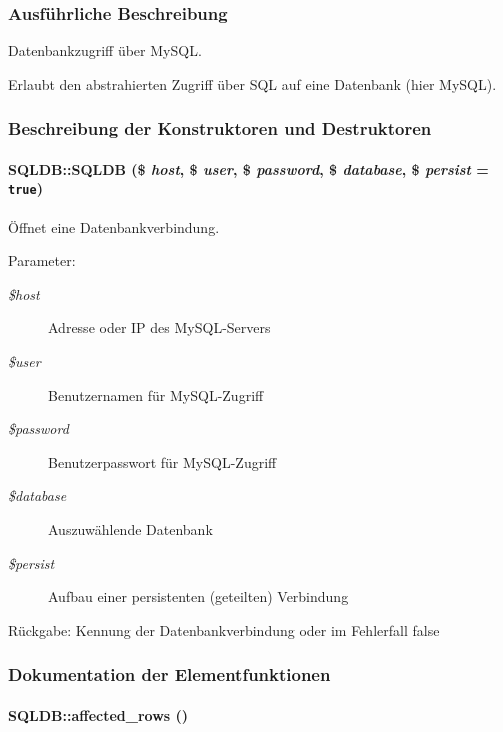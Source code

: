 \subsubsection{Ausf\"{u}hrliche Beschreibung}
Datenbankzugriff über My\-SQL. 

Erlaubt den abstrahierten Zugriff über SQL auf eine Datenbank (hier My\-SQL). 



\subsubsection{Beschreibung der Konstruktoren und Destruktoren}
\hypertarget{classSQLDB_069ba0502ed4bfedb72768a03ff6854d}{
\paragraph[SQLDB]{\setlength{\rightskip}{0pt plus 5cm}SQLDB::SQLDB (\$ {\em host}, \$ {\em user}, \$ {\em password}, \$ {\em database}, \$ {\em persist} = {\tt true})}\hfill}
\label{classSQLDB_069ba0502ed4bfedb72768a03ff6854d}


Öffnet eine Datenbankverbindung. 

\begin{Desc}
\item[Parameter:]
\begin{description}
\item[{\em \$host}]Adresse oder IP des My\-SQL-Servers \item[{\em \$user}]Benutzernamen für My\-SQL-Zugriff \item[{\em \$password}]Benutzerpasswort für My\-SQL-Zugriff \item[{\em \$database}]Auszuwählende Datenbank \item[{\em \$persist}]Aufbau einer persistenten (geteilten) Verbindung \end{description}
\end{Desc}
\begin{Desc}
\item[R\"{u}ckgabe:]Kennung der Datenbankverbindung oder im Fehlerfall false \end{Desc}


\subsubsection{Dokumentation der Elementfunktionen}
\hypertarget{classSQLDB_2d1ec94a4c94e4a505ec37f944363954}{
\paragraph[affected\_\-rows]{\setlength{\rightskip}{0pt plus 5cm}SQLDB::affected\_\-rows ()}\hfill}
\label{classSQLDB_2d1ec94a4c94e4a505ec37f944363954}


